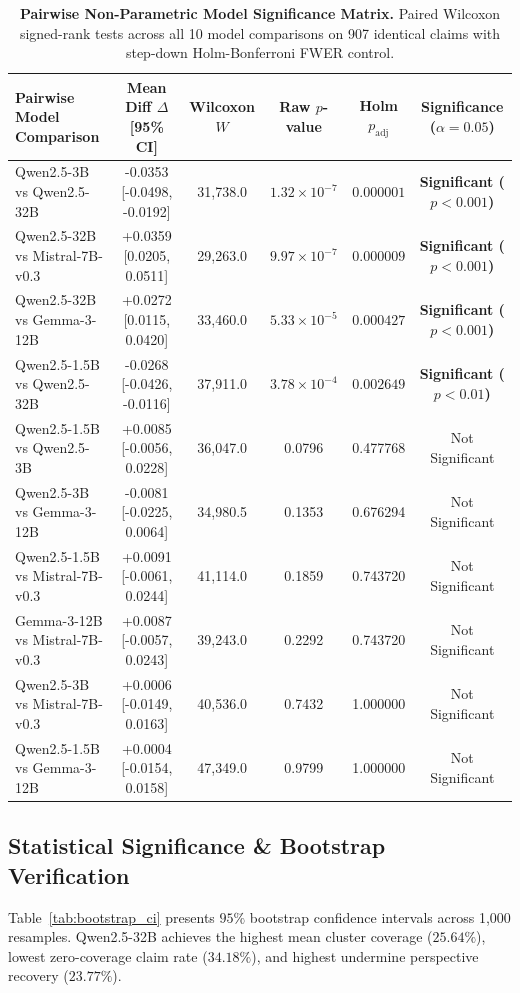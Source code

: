 \documentclass[11pt,a4paper]{article}
\begin{document}
\begin{table}[t]
\centering
\small
\begin{tabular}{lccccc}
\toprule
\textbf{Pairwise Model Comparison} & \textbf{Mean Diff $\Delta$ [95\% CI]} & \textbf{Wilcoxon $W$} & \textbf{Raw $p$-value} & \textbf{Holm $p_{\text{adj}}$} & \textbf{Significance ($\alpha = 0.05$)} \\
\midrule
Qwen2.5-3B vs Qwen2.5-32B & -0.0353 [-0.0498, -0.0192] & 31,738.0 & $1.32 \times 10^{-7}$ & $\mathbf{0.000001}$ & \textbf{Significant ($p < 0.001$)} \\
Qwen2.5-32B vs Mistral-7B-v0.3 & +0.0359 [0.0205, 0.0511] & 29,263.0 & $9.97 \times 10^{-7}$ & $\mathbf{0.000009}$ & \textbf{Significant ($p < 0.001$)} \\
Qwen2.5-32B vs Gemma-3-12B & +0.0272 [0.0115, 0.0420] & 33,460.0 & $5.33 \times 10^{-5}$ & $\mathbf{0.000427}$ & \textbf{Significant ($p < 0.001$)} \\
Qwen2.5-1.5B vs Qwen2.5-32B & -0.0268 [-0.0426, -0.0116] & 37,911.0 & $3.78 \times 10^{-4}$ & $\mathbf{0.002649}$ & \textbf{Significant ($p < 0.01$)} \\
Qwen2.5-1.5B vs Qwen2.5-3B & +0.0085 [-0.0056, 0.0228] & 36,047.0 & 0.0796 & 0.477768 & Not Significant \\
Qwen2.5-3B vs Gemma-3-12B & -0.0081 [-0.0225, 0.0064] & 34,980.5 & 0.1353 & 0.676294 & Not Significant \\
Qwen2.5-1.5B vs Mistral-7B-v0.3 & +0.0091 [-0.0061, 0.0244] & 41,114.0 & 0.1859 & 0.743720 & Not Significant \\
Gemma-3-12B vs Mistral-7B-v0.3 & +0.0087 [-0.0057, 0.0243] & 39,243.0 & 0.2292 & 0.743720 & Not Significant \\
Qwen2.5-3B vs Mistral-7B-v0.3 & +0.0006 [-0.0149, 0.0163] & 40,536.0 & 0.7432 & 1.000000 & Not Significant \\
Qwen2.5-1.5B vs Gemma-3-12B & +0.0004 [-0.0154, 0.0158] & 47,349.0 & 0.9799 & 1.000000 & Not Significant \\
\bottomrule
\end{tabular}
\caption{\textbf{Pairwise Non-Parametric Model Significance Matrix.} Paired Wilcoxon signed-rank tests across all 10 model comparisons on 907 identical claims with step-down Holm-Bonferroni FWER control.}
\label{tab:pairwise_significance}
\end{table}

\subsection{Statistical Significance & Bootstrap Verification}
Table~\ref{tab:bootstrap_ci} presents $95\%$ bootstrap confidence intervals across 1,000 resamples. Qwen2.5-32B achieves the highest mean cluster coverage ($25.64\%$), lowest zero-coverage claim rate ($34.18\%$), and highest undermine perspective recovery ($23.77\%$).
\end{document}

